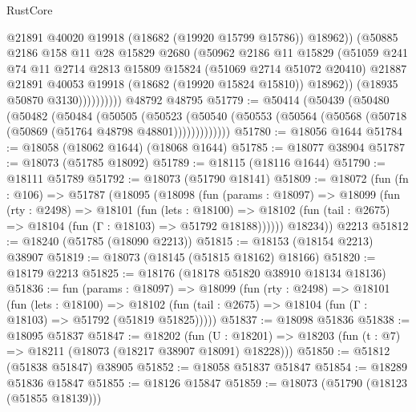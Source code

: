 \begin{lexlean}{RustCore}
\begin{coremodule}
                        @21891
                        @40020
                        @19918
                        (@18682 (@19920 @15799 @15786))
                        @18962))
                    (@50885
                      @2186
                      @158
                      @11
                      @28
                      @15829
                      @2680
                      (@50962
                        @2186
                        @11
                        @15829
                        (@51059
                          @241
                          @74
                          @11
                          @2714
                          @2813
                          @15809
                          @15824
                          (@51069 @2714 @51072 @20410)
                          @21887
                          @21891
                          @40053
                          @19918
                          (@18682 (@19920 @15824 @15810))
                          @18962))
                      (@18935 @50870 @3130))))))))))
    @48792
    @48795
@51779 := @50414
    (@50439
      (@50480
        (@50482
          (@50484
            (@50505
              (@50523
                (@50540 (@50553 (@50564 (@50568 (@50718 (@50869 (@51764 @48798 @48801)))))))))))))
@51780 := @18056 @1644
@51784 := @18058 (@18062 @1644) (@18068 @1644)
@51785 := @18077 @38904
@51787 := @18073 (@51785 @18092)
@51789 := @18115 (@18116 @1644)
@51790 := @18111 @51789
@51792 := @18073 (@51790 @18141)
@51809 := @18072
    (fun (fn : @106) =>
    @51787
      (@18095
        (@18098
          (fun (params : @18097) =>
          @18099
            (fun (rty : @2498) =>
            @18101
              (fun (lets : @18100) =>
              @18102 (fun (tail : @2675) => @18104 (fun (Γ : @18103) => @51792 @18188))))))
        @18234))
    @2213
@51812 := @18240 (@51785 (@18090 @2213))
@51815 := @18153 (@18154 @2213) @38907
@51819 := @18073 (@18145 (@51815 @18162) @18166)
@51820 := @18179 @2213
@51825 := @18176 (@18178 @51820 @38910 @18134 @18136)
@51836 := fun (params : @18097) =>
  @18099
    (fun (rty : @2498) =>
    @18101
      (fun (lets : @18100) =>
      @18102 (fun (tail : @2675) => @18104 (fun (Γ : @18103) => @51792 (@51819 @51825)))))
@51837 := @18098 @51836
@51838 := @18095 @51837
@51847 := @18202
    (fun (U : @18201) => @18203 (fun (t : @7) => @18211 (@18073 (@18217 @38907 @18091) @18228)))
@51850 := @51812 (@51838 @51847) @38905
@51852 := @18058 @51837 @51847
@51854 := @18289 @51836 @15847
@51855 := @18126 @15847
@51859 := @18073 (@51790 (@18123 (@51855 @18139)))

\end{coremodule}
\end{lexlean}
